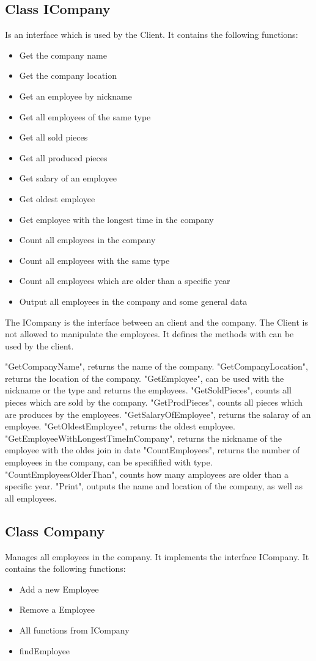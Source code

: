 \subsection{Class ICompany}
Is an interface which is used by the Client.
It contains the following functions:
\begin{itemize}
	\item Get the company name
	\item Get the company location
	\item Get an employee by nickname
	\item Get all employees of the same type
	\item Get all sold pieces
	\item Get all produced pieces
	\item Get salary of an employee
	\item Get oldest employee
	\item Get employee with the longest time in the company
	\item Count all employees in the company
	\item Count all employees with the same type
	\item Count all employees which are older than a specific year
	\item Output all employees in the company and some general data
\end{itemize}

The ICompany is the interface between an client and the company. The Client is not allowed to manipulate the employees.
It defines the methods with can be used by the client.

"GetCompanyName", returns the name of the company.
"GetCompanyLocation", returns the location of the company.
"GetEmployee", can be used with the nickname or the type and returns the employees.
"GetSoldPieces", counts all pieces which are sold by the company.
"GetProdPieces", counts all pieces which are produces by the employees.
"GetSalaryOfEmployee", returns the salaray of an employee.
"GetOldestEmployee", returns the oldest employee.
"GetEmployeeWithLongestTimeInCompany", returns the nickname of the employee with the oldes join in date
"CountEmployees", returns the number of employees in the company, can be specifified with type.
"CountEmployeesOlderThan", counts how many amployees are older than a specific year.
"Print", outputs the name and location of the company, as well as all employees.
\newpage

\subsection{Class Company}
Manages all employees in the company. It implements the interface ICompany.
It contains the following functions:
\begin{itemize}
	\item Add a new Employee
	\item Remove a Employee
	\item All functions from ICompany
	\item findEmployee
\end{itemize}

